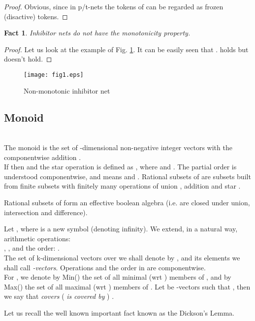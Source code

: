 \documentclass[a4paper]{llncs}
\newtheorem{fact}{Fact}
\begin{document}
\begin{proof}
Obvious, since in p/t-nets the tokens of  can be regarded as frozen (disactive) tokens. 	
\end{proof}
	
\begin{fact}
\label{f28}
Inhibitor nets do not have the monotonicity property.
\end{fact}

\begin{proof}
Let us look at the example of Fig. \ref{Fig1}. It can be easily seen that .  holds but  doesn't hold.	
\end{proof}

\begin{figure}[h]
\centering
\texttt{[image: fig1.eps]}
\caption{Non-monotonic inhibitor net}
\label{Fig1}
\end{figure}


\subsection{Monoid }
\begin{definition}
\label{def_mon}\\
The monoid  is the set of -dimensional non-negative integer vectors with the componentwise addition .
\\
If  then  and the star operation is defined as , where  and . The partial order  is understood componentwise, and  means   and  . Rational subsets of  are subsets built from finite subsets with finitely many operations of union  , addition  and star .
\end{definition}
\begin{theorem}
\label{twGins}
Rational subsets of  form an effective boolean algebra (i.e. are closed under union, intersection and difference).

\end{theorem}
\begin{definition} [-extension]
\label{d25}
Let , where   is a new symbol (denoting infinity). We extend, in a natural way, arithmetic operations: \\, , and the order: . \\The set of k-dimensional vectors over  we shall denote by , and its elements we shall call \emph{-vectors}. Operations  and the order  in  are componentwise.
\\ 
For , we denote by Min() the set of all minimal (wrt ) members of , and by Max() the set of all maximal (wrt ) members of . Let  be -vectors such that , then we say that \emph{ covers } (\emph{ is covered by }) .
\end{definition}
Let us recall the well known important fact known as the Dickson's Lemma.
\end{document}

